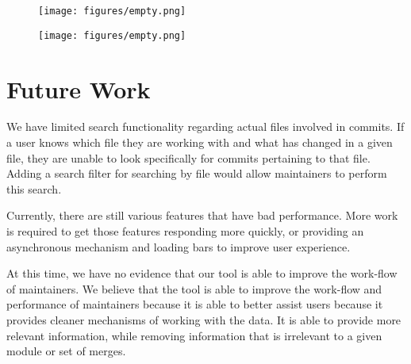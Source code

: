 \documentclass[conference, draftclsnofoot]{IEEEtran}
\begin{document}
\begin{figure}[h!]
	\centering
	\texttt{[image: figures/empty.png]}
	\caption{}
	\label{fig:AndrewMortonMerges}
\end{figure}

\begin{figure}[h!]
	\centering
	\texttt{[image: figures/empty.png]}
	\caption{}
	\label{fig:AndrewMorton}
\end{figure}




\section{Future Work}
We have limited search functionality regarding actual files involved in
commits. If a user knows which file they are working with and what has changed
in a given file, they are unable to look specifically for commits pertaining to
that file. Adding a search filter for searching by file would allow maintainers
to perform this search.

Currently, there are still various features that have bad performance. More
work is required to get those features responding more quickly, or providing an
asynchronous mechanism and loading bars to improve user experience.

At this time, we have no evidence that our tool is able to improve the
work-flow of maintainers. We believe that the tool is able to improve the
work-flow and performance of maintainers because it is able to better assist
users because it provides cleaner mechanisms of working with the data. It is
able to provide more relevant information, while removing information that is
irrelevant to a given module or set of merges.
\end{document}
